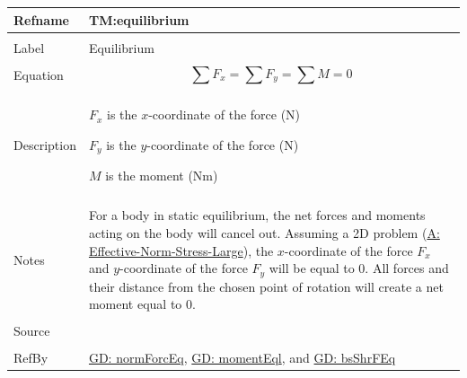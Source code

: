 \documentclass[12pt]{article}
\begin{document}
\begin{minipage}{\textwidth}
\begin{tabular}{>{\raggedright}p{}>{\raggedright\arraybackslash}p{}}
\toprule \textbf{Refname} & \textbf{TM:equilibrium}
\label{TM:equilibrium}
\\ \midrule \\
Label & Equilibrium
        
\\ \midrule \\
Equation & \begin{displaymath}
           \displaystyle\sum{{F_{x}}}=\displaystyle\sum{{F_{y}}}=\displaystyle\sum{M}=0
           \end{displaymath}
\\ \midrule \\
Description & \begin{symbDescription}
              \item{${F_{x}}$ is the $x$-coordinate of the force (N)}
              \item{${F_{y}}$ is the $y$-coordinate of the force (N)}
              \item{$M$ is the moment (Nm)}
              \end{symbDescription}
\\ \midrule \\
Notes & For a body in static equilibrium, the net forces and moments acting on the body will cancel out. Assuming a 2D problem (\hyperref[assumpENSL]{A: Effective-Norm-Stress-Large}), the $x$-coordinate of the force ${F_{x}}$ and $y$-coordinate of the force ${F_{y}}$ will be equal to $0$. All forces and their distance from the chosen point of rotation will create a net moment equal to $0$.
        
\\ \midrule \\
Source & \cite{fredlund1977}
         
\\ \midrule \\
RefBy & \hyperref[GD:normForcEq]{GD: normForcEq}, \hyperref[GD:momentEql]{GD: momentEql}, and \hyperref[GD:bsShrFEq]{GD: bsShrFEq}
        
\\ \bottomrule
\end{tabular}
\end{minipage}
\vspace{\baselineskip}
\noindent
\end{document}
